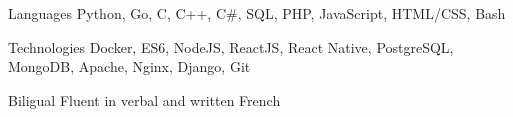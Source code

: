 


\begin{cvskills}

\cvskill
{Languages} %
{Python, Go, C, C++, C\#, SQL, PHP, JavaScript, HTML/CSS, Bash} %


\cvskill
{Technologies} %
{Docker, ES6, NodeJS, ReactJS, React Native, PostgreSQL, MongoDB, Apache, Nginx, Django, Git} %


\cvskill
{Biligual} %
{Fluent in verbal and written French} %


\end{cvskills}
\addvspace{2ex}
